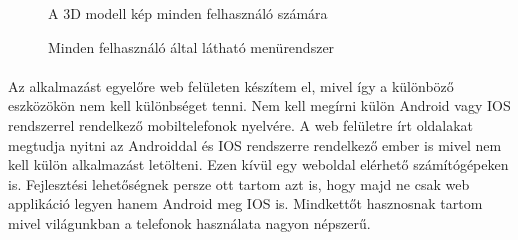 \documentclass{article}
\begin{document}
	\begin{figure}
		\centering
		\caption{A 3D modell kép minden felhasználó számára}
		\label{fig:modell}
	\end{figure}

	\begin{figure}
		\centering
		\caption{Minden felhasználó által látható menürendszer}
		\label{fig:drawbarevery}
	\end{figure}
	
	\paragraph{}
	Az alkalmazást egyelőre web felületen készítem el, mivel így a különböző eszközökön nem kell különbséget tenni. Nem kell megírni külön Android vagy IOS rendszerrel rendelkező mobiltelefonok nyelvére. A web felületre írt oldalakat megtudja nyitni az Androiddal és IOS rendszerre rendelkező ember is mivel nem kell külön alkalmazást letölteni. Ezen kívül egy weboldal elérhető számítógépeken is. Fejlesztési lehetőségnek persze ott tartom azt is, hogy majd ne csak web applikáció legyen hanem Android meg IOS is. Mindkettőt hasznosnak tartom mivel világunkban a telefonok használata nagyon népszerű. 
	
\end{document}
